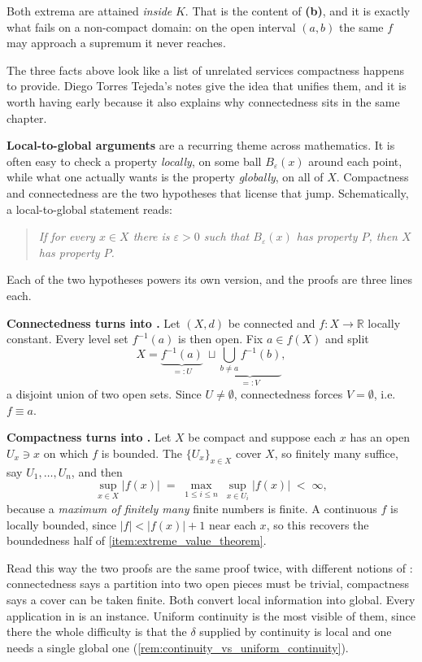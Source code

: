 Both extrema are attained \emph{inside} $K$. That is the content of \textbf{(b)}, and it is
exactly what fails on a non-compact domain: on the open interval $(a,b)$ the same $f$ may
approach a supremum it never reaches.

\begin{remark}
\label{rem:local_to_global}
The three facts above look like a list of unrelated services compactness happens to provide.
Diego Torres Tejeda's notes give the idea that unifies them, and it is worth having early
because it also explains why connectedness sits in the same chapter.

\textbf{Local-to-global arguments} are a recurring theme across mathematics. It is often easy to
check a property \emph{locally}, on some ball $B_\varepsilon(x)$ around each point, while what one
actually wants is the property \emph{globally}, on all of $X$. Compactness and
connectedness are the two hypotheses that license that jump. Schematically, a local-to-global
statement reads:
\begin{quote}
\itshape
If for every $x \in X$ there is $\varepsilon>0$ such that $B_\varepsilon(x)$ has property $P$,
then $X$ has property $P$.
\end{quote}
Each of the two hypotheses powers its own version, and the proofs are three lines each.

\textbf{Connectedness turns  into .} Let $(X,d)$ be connected
and $f : X \to \mathbb{R}$ locally constant. Every level set $f^{-1}(a)$ is then open. Fix
$a \in f(X)$ and split
\[X = \underbrace{f^{-1}(a)}_{=:U} \ \sqcup \underbrace{\bigcup_{b \neq a}f^{-1}(b)}_{=:V},\]
a disjoint union of two open sets. Since $U \neq \emptyset$, connectedness forces $V=\emptyset$,
i.e.\ $f \equiv a$.

\textbf{Compactness turns  into .} Let $X$ be compact and
suppose each $x$ has an open $U_x \ni x$ on which $f$ is bounded. The $\{U_x\}_{x\in X}$ cover
$X$, so finitely many suffice, say $U_1,\dots,U_n$, and then
\[\sup_{x \in X}|f(x)| \;=\; \max_{1\leq i\leq n}\ \sup_{x \in U_i}|f(x)| \;<\; \infty,\]
because a \emph{maximum of finitely many} finite numbers is finite. A continuous $f$ is locally
bounded, since $|f|<|f(x)|+1$ near each $x$, so this recovers the boundedness half of
\cref{item:extreme_value_theorem}.

Read this way the two proofs are the same proof twice, with different notions of : connectedness says a partition into two open pieces must be trivial, compactness says a
cover can be taken finite. Both convert local information into global. Every application in
is an instance. Uniform continuity is the most visible of them, since there the whole difficulty
is that the $\delta$ supplied by continuity is local and one needs a single global one
(\cref{rem:continuity_vs_uniform_continuity}).
\end{remark}

